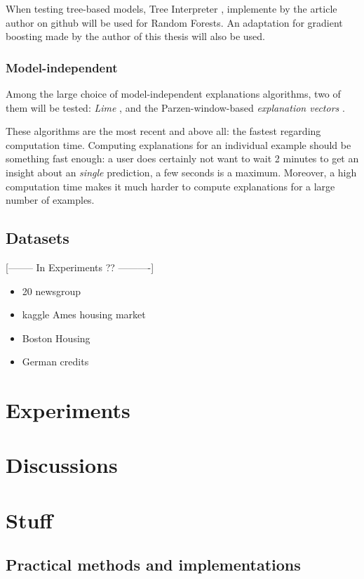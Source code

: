\documentclass[a4paper,11pt]{kth-mag}
\begin{document}
When testing tree-based models, Tree Interpreter \cite{treeinterpreter}, implemente by the article author on github will be used for Random Forests. An adaptation for gradient boosting made by the author of this thesis will also be used.

\subsection{Model-independent}

Among the large choice of model-independent explanations algorithms, two of them will be tested: \textit{Lime} \cite{lime}, and the Parzen-window-based \textit{explanation vectors} \cite{explvect}.

These algorithms are the most recent and above all: the fastest regarding computation time. Computing explanations for an individual example should be something fast enough: a user does certainly not want to wait 2 minutes to get an insight about an \textit{single} prediction, a few seconds is a maximum. Moreover, a high computation time makes it much harder to compute explanations for a large number of examples.

\section{Datasets}

[-------- In Experiments ?? ----------]
\begin{itemize}
    \item 20 newsgroup
    \item kaggle Ames housing market
    \item Boston Housing
    \item German credits
\end{itemize}

\chapter{Experiments}

\chapter{Discussions}




\chapter{Stuff}


\section{Practical methods and implementations}
\end{document}
